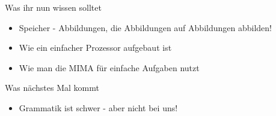 







\begin{frame}	
	\begin{block}{Was ihr nun wissen solltet}
		\begin{itemize}
			\item Speicher - Abbildungen, die Abbildungen auf Abbildungen abbilden!
			\item Wie ein einfacher Prozessor aufgebaut ist
			\item Wie man die MIMA für einfache Aufgaben nutzt
		\end{itemize}
	\end{block}
	
	\begin{block}{Was nächstes Mal kommt}
		\begin{itemize}
			\item Grammatik ist schwer - aber nicht bei uns!
		\end{itemize}
	\end{block}
\end{frame}


\slideThanks

